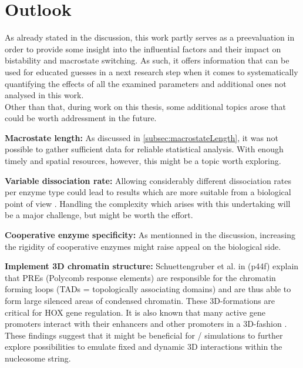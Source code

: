 \chapter{Outlook}
    \label{cha:outlook}

    As already stated in the discussion, this work partly serves as a preevaluation in order to provide some insight into the influential factors and their impact on bistability and macrostate switching. As such, it offers information that can be used for educated guesses in a next research step when it comes to systematically quantifying the effects of all the examined parameters and additional ones not analysed in this work.\\

    Other than that, during work on this thesis, some additional topics arose that could be worth addressment in the future.

    \begin{itemize}
        {
            \item \textbf{Macrostate length:} As discussed in \ref{subsec:macrostateLength}, it was not possible to gather sufficient data for reliable statistical analysis. With enough timely and spatial resources, however, this might be a topic worth exploring.
            \item \textbf{Variable dissociation rate:} Allowing considerably different dissociation rates per enzyme type could lead to results which are more suitable from a biological point of view \cite{Tanner2000HATKinetics}. Handling the complexity which arises with this undertaking will be a major challenge, but might be worth the effort.
            \item \textbf{Cooperative enzyme specificity:} As mentionned in the discussion, increasing the rigidity of cooperative enzymes might raise appeal on the biological side.
            \item \textbf{Implement 3D chromatin structure:} Schuettengruber et al. in \cite{schuettengruber2017genome} (p44f) explain that PREs (Polycomb response elements) are responsible for the chromatin forming loops (TADs = topologically associating domains) and are thus able to form large silenced areas of condensed chromatin. These 3D-formations are critical for HOX gene regulation. It is also known that many active gene promoters interact with their enhancers and other promoters in a 3D-fashion \cite{javierre2016lineage}. These findings suggest that it might be beneficial for \ed/ simulations to further explore possibilities to emulate fixed and dynamic 3D interactions within the nucleosome string.
        }
    \end{itemize}
%
%